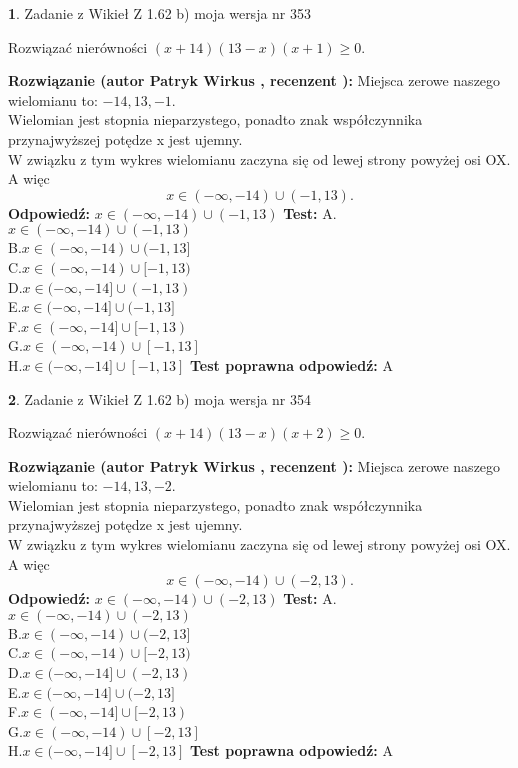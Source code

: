 \documentclass[12pt, a4paper]{article}
\theoremstyle{definition} %
\newtheorem{zad}{}
\newcommand{\zadStart}[1]{\begin{zad}#1\newline}
\newcommand{\zadStop}{\end{zad}}
\newcommand{\rozwStart}[2]{\noindent \textbf{Rozwiązanie (autor #1 , recenzent #2): }\newline}
\newcommand{\rozwStop}{\newline}
\newcommand{\odpStart}{\noindent \textbf{Odpowiedź:}\newline}
\newcommand{\odpStop}{\newline}
\newcommand{\testStart}{\noindent \textbf{Test:}\newline}
\newcommand{\testStop}{\newline}
\newcommand{\kluczStart}{\noindent \textbf{Test poprawna odpowiedź:}\newline}
\newcommand{\kluczStop}{\newline}
\begin{document}
\zadStart{Zadanie z Wikieł Z 1.62 b) moja wersja nr 353}

Rozwiązać nierówności $(x+14)(13-x)(x+1)\ge0$.
\zadStop
\rozwStart{Patryk Wirkus}{}
Miejsca zerowe naszego wielomianu to: $-14, 13, -1$.\\
Wielomian jest stopnia nieparzystego, ponadto znak współczynnika przy\linebreak najwyższej potędze x jest ujemny.\\ W związku z tym wykres wielomianu zaczyna się od lewej strony powyżej osi OX. A więc $$x \in (-\infty,-14) \cup (-1,13).$$
\rozwStop
\odpStart
$x \in (-\infty,-14) \cup (-1,13)$
\odpStop
\testStart
A.$x \in (-\infty,-14) \cup (-1,13)$\\
B.$x \in (-\infty,-14) \cup (-1,13]$\\
C.$x \in (-\infty,-14) \cup [-1,13)$\\
D.$x \in (-\infty,-14] \cup (-1,13)$\\
E.$x \in (-\infty,-14] \cup (-1,13]$\\
F.$x \in (-\infty,-14] \cup [-1,13)$\\
G.$x \in (-\infty,-14) \cup [-1,13]$\\
H.$x \in (-\infty,-14] \cup [-1,13]$
\testStop
\kluczStart
A
\kluczStop



\zadStart{Zadanie z Wikieł Z 1.62 b) moja wersja nr 354}

Rozwiązać nierówności $(x+14)(13-x)(x+2)\ge0$.
\zadStop
\rozwStart{Patryk Wirkus}{}
Miejsca zerowe naszego wielomianu to: $-14, 13, -2$.\\
Wielomian jest stopnia nieparzystego, ponadto znak współczynnika przy\linebreak najwyższej potędze x jest ujemny.\\ W związku z tym wykres wielomianu zaczyna się od lewej strony powyżej osi OX. A więc $$x \in (-\infty,-14) \cup (-2,13).$$
\rozwStop
\odpStart
$x \in (-\infty,-14) \cup (-2,13)$
\odpStop
\testStart
A.$x \in (-\infty,-14) \cup (-2,13)$\\
B.$x \in (-\infty,-14) \cup (-2,13]$\\
C.$x \in (-\infty,-14) \cup [-2,13)$\\
D.$x \in (-\infty,-14] \cup (-2,13)$\\
E.$x \in (-\infty,-14] \cup (-2,13]$\\
F.$x \in (-\infty,-14] \cup [-2,13)$\\
G.$x \in (-\infty,-14) \cup [-2,13]$\\
H.$x \in (-\infty,-14] \cup [-2,13]$
\testStop
\kluczStart
A
\kluczStop
\end{document}
